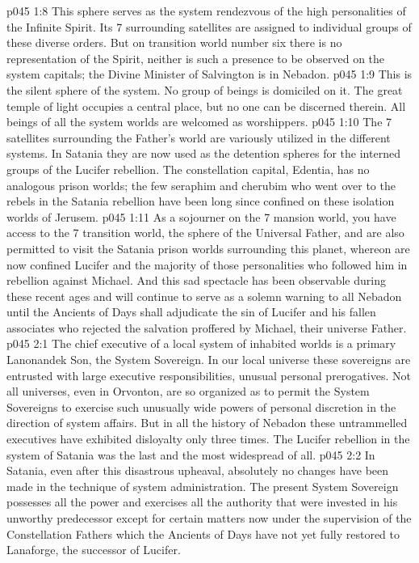 \vs p045 1:8 \pc {} This sphere serves as the system rendezvous of the high personalities of the Infinite Spirit. Its 7 surrounding satellites are assigned to individual groups of these diverse orders. But on transition world number six there is no representation of the Spirit, neither is such a presence to be observed on the system capitals; the Divine Minister of Salvington is  in Nebadon.
\vs p045 1:9 \pc {} This is the silent sphere of the system. No group of beings is domiciled on it. The great temple of light occupies a central place, but no one can be discerned therein. All beings of all the system worlds are welcomed as worshippers.
\vs p045 1:10 The 7 satellites surrounding the Father’s world are variously utilized in the different systems. In Satania they are now used as the detention spheres for the interned groups of the Lucifer rebellion. The constellation capital, Edentia, has no analogous prison worlds; the few seraphim and cherubim who went over to the rebels in the Satania rebellion have been long since confined on these isolation worlds of Jerusem.
\vs p045 1:11 As a sojourner on the 7 mansion world, you have access to the 7 transition world, the sphere of the Universal Father, and are also permitted to visit the Satania prison worlds surrounding this planet, whereon are now confined Lucifer and the majority of those personalities who followed him in rebellion against Michael. And this sad spectacle has been observable during these recent ages and will continue to serve as a solemn warning to all Nebadon until the Ancients of Days shall adjudicate the sin of Lucifer and his fallen associates who rejected the salvation proffered by Michael, their universe Father.
\vs p045 2:1 The chief executive of a local system of inhabited worlds is a primary Lanonandek Son, the System Sovereign. In our local universe these sovereigns are entrusted with large executive responsibilities, unusual personal prerogatives. Not all universes, even in Orvonton, are so organized as to permit the System Sovereigns to exercise such unusually wide powers of personal discretion in the direction of system affairs. But in all the history of Nebadon these untrammelled executives have exhibited disloyalty only three times. The Lucifer rebellion in the system of Satania was the last and the most widespread of all.
\vs p045 2:2 In Satania, even after this disastrous upheaval, absolutely no changes have been made in the technique of system administration. The present System Sovereign possesses all the power and exercises all the authority that were invested in his unworthy predecessor except for certain matters now under the supervision of the Constellation Fathers which the Ancients of Days have not yet fully restored to Lanaforge, the successor of Lucifer.
